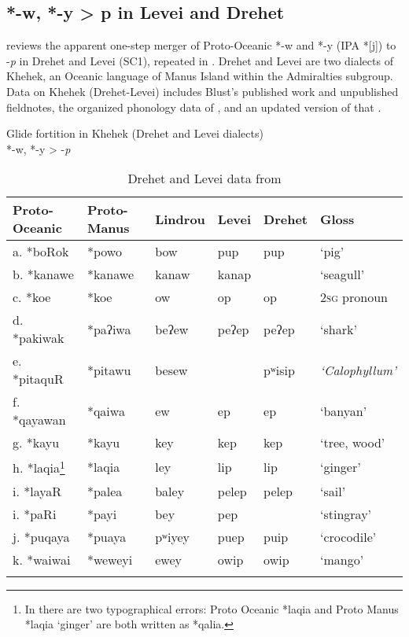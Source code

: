 \documentclass[output=paper]{langscibook}
\begin{document}
\subsection{*-w, *-y  > p in Levei and Drehet}\label{sec:blevins:2.1}
\citet{Goddard2007} reviews the apparent one-step merger of Proto-Oceanic *-w and *-y (IPA *[j]) to -\textit{p} in Drehet and Levei (SC1), repeated in . Drehet and Levei are two dialects of Khehek, an Oceanic language of Manus Island within the Admiralties subgroup. Data on Khehek (Drehet-Levei) includes Blust’s published work and unpublished fieldnotes, the organized phonology data of \citet{Beard1992}, and an updated version of that \citep{SIL2004}.

\ea%
    \label{ex:blevins:2}
         Glide fortition in Khehek (Drehet and Levei dialects)\\
*-w, *-y > -\textit{p}
\z

\begin{table}[b]
\begin{tabular}{llllll}
\lsptoprule
{Proto-Oceanic} & {Proto-Manus} & {Lindrou} & {Levei} & {Drehet} & {Gloss}\\
\midrule
a. *boRok & *powo & bow & pup & pup & `pig'\\
b. *kanawe & *kanawe & kanaw & kanap &  & `seagull'\\
c. *koe & *koe & ow & op & op & \textsc{2sg} pronoun\\
d. *pakiwak & *paʔiwa & beʔew & peʔep & peʔep & `shark'\\
e. *pitaquR & *pitawu & besew &  & pʷisip & \textit{`Calophyllum'}\\
f. *qayawan & *qaiwa & ew & ep & ep & `banyan'\\
\tablevspace
g. *kayu & *kayu & key & kep & kep & `tree, wood'\\
h. *laqia\footnote{In \textcite[231, Table 1]{Blust1995} there are two typographical errors: Proto Oceanic *laqia and Proto Manus *laqia ‘ginger’ are both written as *qalia.} & *laqia & ley & lip & lip & `ginger'\\
i. *layaR & *palea & baley & pelep & pelep & `sail'\\
i. *paRi & *payi & bey & pep &  & `stingray'\\
j. *puqaya & *puaya & pʷiyey & puep & puip & `crocodile'\\
k. *waiwai & *weweyi & ewey & owip & owip & `mango'\\
\lspbottomrule
\end{tabular}
\caption{\label{tab:blevins:2}Drehet and Levei data from \citet[230--231]{Blust2005}}
\end{table}
\end{document}
